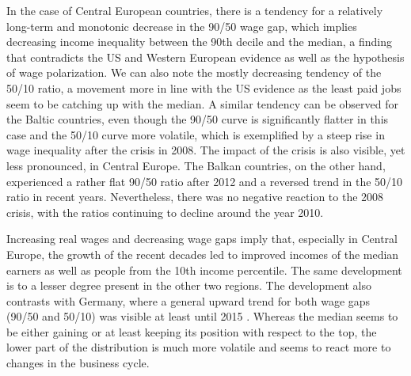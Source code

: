 \documentclass[11pt]{article}
\begin{document}
In the case of Central European countries, there is a tendency for a relatively long-term and monotonic decrease in the 90/50 wage gap, which implies decreasing income inequality between the 90th decile and the median, a finding that contradicts the US and Western European evidence as well as the hypothesis of wage polarization. We can also note the mostly decreasing tendency of the 50/10 ratio, a movement more in line with the US evidence as the least paid jobs seem to be catching up with the median. A similar tendency can be observed for the Baltic countries, even though the 90/50 curve is significantly flatter in this case and the 50/10 curve more volatile, which is exemplified by a steep rise in wage inequality after the crisis in 2008. The impact of the crisis is also visible, yet less pronounced, in Central Europe. The Balkan countries, on the other hand, experienced a rather flat 90/50 ratio after 2012 and a reversed trend in the 50/10 ratio in recent years. Nevertheless, there was no negative reaction to the 2008 crisis, with the ratios continuing to decline around the year 2010.

Increasing real wages and decreasing wage gaps imply that, especially in Central Europe, the growth of the recent decades led to improved incomes of the median earners as well as people from the 10th income percentile. The same development is to a lesser degree present in the other two regions. The development also contrasts with Germany, where a general upward trend for both wage gaps (90/50 and 50/10) was visible at least until 2015 \citep{biewen2021labour}. Whereas the median seems to be either gaining or at least keeping its position with respect to the top, the lower part of the distribution is much more volatile and seems to react more to changes in the business cycle.
\end{document}
